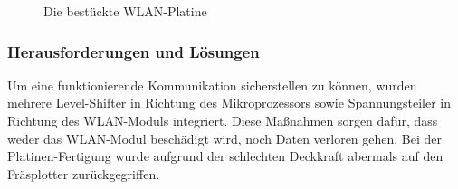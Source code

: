     \begin{figure}[tbh]
      \begin{centering}
      \par\end{centering}
      \caption{Die bestückte WLAN-Platine}
      \label{WLAN-Platine}
    \end{figure}


    \subsubsection{Herausforderungen und Lösungen}
    Um eine funktionierende Kommunikation sicherstellen zu können, wurden mehrere Level-Shifter in Richtung des Mikroprozessors sowie Spannungsteiler in Richtung des WLAN-Moduls
    integriert. Diese Maßnahmen sorgen dafür, dass weder das WLAN-Modul beschädigt wird, noch Daten verloren gehen.
    Bei der Platinen-Fertigung wurde aufgrund der schlechten Deckkraft abermals auf den Fräsplotter zurückgegriffen.
